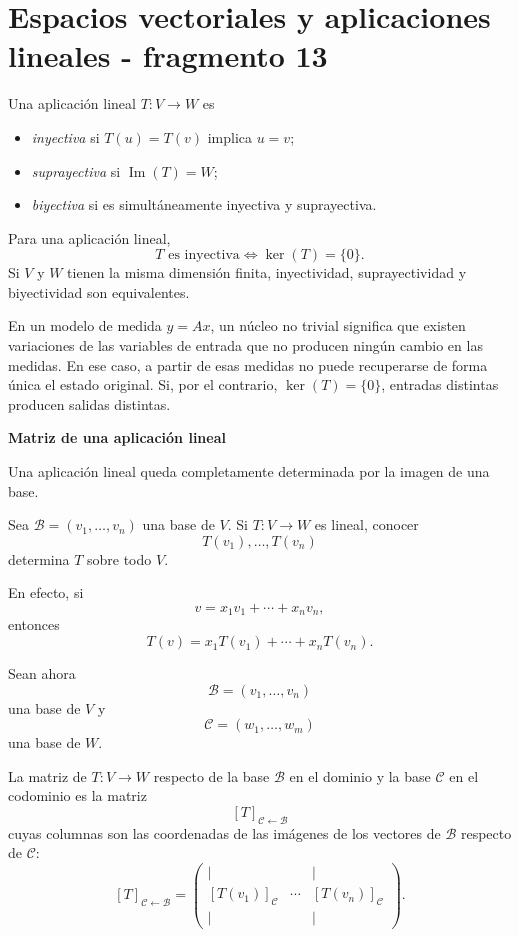 \section{Espacios vectoriales y aplicaciones lineales - fragmento 13}
\begin{definition}
Una aplicación lineal $T:V\to W$ es
\begin{itemize}
\item \emph{inyectiva} si $T(u)=T(v)$ implica $u=v$;
\item \emph{suprayectiva} si $\operatorname{Im}(T)=W$;
\item \emph{biyectiva} si es simultáneamente inyectiva y suprayectiva.
\end{itemize}
\end{definition}

Para una aplicación lineal,
\[
T\text{ es inyectiva}
\iff
\ker(T)=\{0\}.
\]
Si $V$ y $W$ tienen la misma dimensión finita, inyectividad, suprayectividad y biyectividad son equivalentes.

En un modelo de medida $y=Ax$, un núcleo no trivial significa que existen variaciones de las variables de entrada que no producen ningún cambio en las medidas. En ese caso, a partir de esas medidas no puede recuperarse de forma única el estado original. Si, por el contrario, $\ker(T)=\{0\}$, entradas distintas producen salidas distintas.

\textbf{Matriz de una aplicación lineal}

Una aplicación lineal queda completamente determinada por la imagen de una base.

\begin{theorem}
Sea $\mathcal B=(v_1,\ldots,v_n)$ una base de $V$. Si $T:V\to W$ es lineal, conocer
\[
T(v_1),\ldots,T(v_n)
\]
determina $T$ sobre todo $V$.
\end{theorem}

En efecto, si
\[
v=x_1v_1+\cdots+x_nv_n,
\]
entonces
\[
T(v)=x_1T(v_1)+\cdots+x_nT(v_n).
\]

Sean ahora
\[
\mathcal B=(v_1,\ldots,v_n)
\]
una base de $V$ y
\[
\mathcal C=(w_1,\ldots,w_m)
\]
una base de $W$.

\begin{definition}
La matriz de $T:V\to W$ respecto de la base $\mathcal B$ en el dominio y la base $\mathcal C$ en el codominio es la matriz
\[
[T]_{\mathcal C\leftarrow\mathcal B}
\]
cuyas columnas son las coordenadas de las imágenes de los vectores de $\mathcal B$ respecto de $\mathcal C$:
\[
[T]_{\mathcal C\leftarrow\mathcal B}
=
\begin{pmatrix}
|&&|\\
[T(v_1)]_{\mathcal C}&\cdots&[T(v_n)]_{\mathcal C}\\
|&&|
\end{pmatrix}.
\]
\end{definition}


